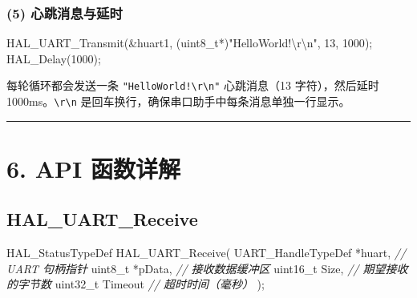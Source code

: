 \documentclass[
  chinese,
  UTF8,
  oneside,
  openany]{ctexbook}
\newenvironment{Shaded}{}{}
\newcommand{\CommentTok}[1]{\textcolor[rgb]{0.38,0.63,0.69}{\textit{#1}}}
\newcommand{\DataTypeTok}[1]{\textcolor[rgb]{0.56,0.13,0.00}{#1}}
\newcommand{\DecValTok}[1]{\textcolor[rgb]{0.25,0.63,0.44}{#1}}
\newcommand{\NormalTok}[1]{#1}
\newcommand{\OperatorTok}[1]{\textcolor[rgb]{0.40,0.40,0.40}{#1}}
\newcommand{\SpecialCharTok}[1]{\textcolor[rgb]{0.25,0.44,0.63}{#1}}
\newcommand{\StringTok}[1]{\textcolor[rgb]{0.25,0.44,0.63}{#1}}
\begin{document}
\subsubsection{(5)
心跳消息与延时}\label{ux5fc3ux8df3ux6d88ux606fux4e0eux5ef6ux65f6}

\begin{Shaded}
\begin{Highlighting}[]
\NormalTok{HAL\_UART\_Transmit}\OperatorTok{(\&}\NormalTok{huart1}\OperatorTok{,} \OperatorTok{(}\DataTypeTok{uint8\_t}\OperatorTok{*)}\StringTok{"HelloWorld!}\SpecialCharTok{\textbackslash{}r\textbackslash{}n}\StringTok{"}\OperatorTok{,} \DecValTok{13}\OperatorTok{,} \DecValTok{1000}\OperatorTok{);}
\NormalTok{HAL\_Delay}\OperatorTok{(}\DecValTok{1000}\OperatorTok{);}
\end{Highlighting}
\end{Shaded}

每轮循环都会发送一条
\texttt{"HelloWorld!\textbackslash{}r\textbackslash{}n"} 心跳消息（13
字符），然后延时 1000ms。\texttt{\textbackslash{}r\textbackslash{}n}
是回车换行，确保串口助手中每条消息单独一行显示。

\begin{center}\rule{0.5\linewidth}{0.5pt}\end{center}

\section{6. API 函数详解}\label{api-ux51fdux6570ux8be6ux89e3}

\subsection{HAL\_UART\_Receive}\label{hal_uart_receive}

\begin{Shaded}
\begin{Highlighting}[]
\NormalTok{HAL\_StatusTypeDef HAL\_UART\_Receive}\OperatorTok{(}
\NormalTok{    UART\_HandleTypeDef }\OperatorTok{*}\NormalTok{huart}\OperatorTok{,}  \CommentTok{// UART 句柄指针}
    \DataTypeTok{uint8\_t}           \OperatorTok{*}\NormalTok{pData}\OperatorTok{,}   \CommentTok{// 接收数据缓冲区}
    \DataTypeTok{uint16\_t}\NormalTok{           Size}\OperatorTok{,}    \CommentTok{// 期望接收的字节数}
    \DataTypeTok{uint32\_t}\NormalTok{           Timeout  }\CommentTok{// 超时时间（毫秒）}
\OperatorTok{);}
\end{Highlighting}
\end{Shaded}
\end{document}
